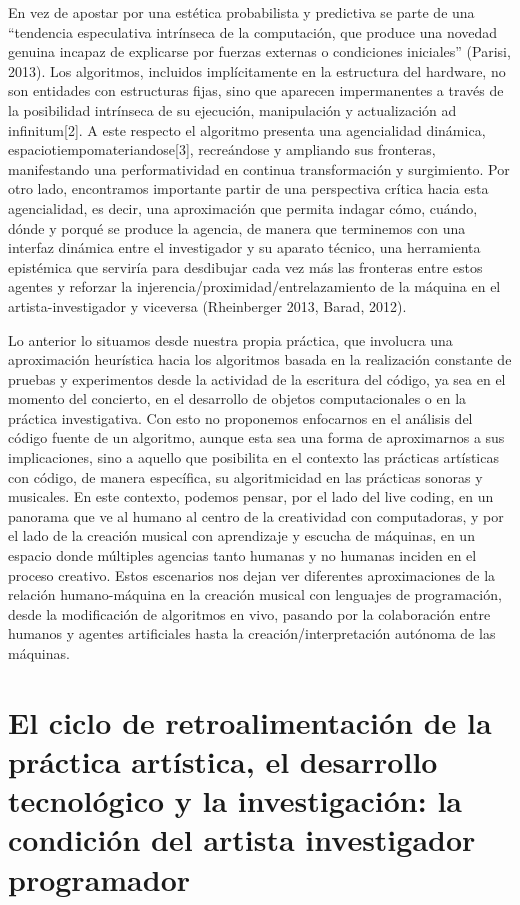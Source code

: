 En vez de apostar por una estética probabilista y predictiva se parte de una “tendencia especulativa intrínseca de la computación, que produce una novedad genuina incapaz de explicarse por fuerzas externas o condiciones iniciales” (Parisi, 2013). Los algoritmos, incluidos implícitamente en la estructura del hardware, no son entidades con estructuras fijas, sino que aparecen impermanentes a través de la posibilidad intrínseca de su ejecución, manipulación y actualización ad infinitum[2]. A este respecto el algoritmo presenta una agencialidad dinámica, espaciotiempomateriandose[3], recreándose y ampliando sus fronteras, manifestando una performatividad en continua transformación y surgimiento. Por otro lado, encontramos importante partir de una perspectiva crítica hacia esta agencialidad, es decir, una aproximación que permita indagar cómo, cuándo, dónde y porqué se produce la agencia, de manera que terminemos con una interfaz dinámica entre el investigador y su aparato técnico, una herramienta epistémica que serviría para desdibujar cada vez más las fronteras entre estos agentes y reforzar la injerencia/proximidad/entrelazamiento de la máquina en el artista-investigador y viceversa (Rheinberger 2013, Barad, 2012).

Lo anterior lo situamos desde nuestra propia práctica, que involucra una aproximación heurística hacia los algoritmos basada en la realización constante de pruebas y experimentos desde la actividad de la escritura del código, ya sea
en el momento del concierto, en el desarrollo de objetos computacionales o en la práctica investigativa. Con esto no proponemos enfocarnos en el análisis del código fuente de un algoritmo, aunque esta sea una forma de aproximarnos a sus implicaciones, sino a aquello que posibilita en el contexto las prácticas artísticas con código, de manera específica, su algoritmicidad en las prácticas sonoras y musicales. En este contexto, podemos pensar, por el lado del live coding, en un panorama que ve al humano al centro de la creatividad con computadoras, y por el lado de la creación musical con aprendizaje y escucha de máquinas, en un espacio donde múltiples agencias tanto humanas y no humanas inciden en el proceso creativo. Estos escenarios nos dejan ver diferentes aproximaciones de la relación humano-máquina en la creación musical con lenguajes de programación, desde la modificación de algoritmos en vivo, pasando por la colaboración entre humanos y agentes artificiales hasta la creación/interpretación autónoma de las máquinas.


\section{El ciclo de retroalimentación de la práctica artística, el desarrollo tecnológico y la investigación: la condición del artista investigador programador}

